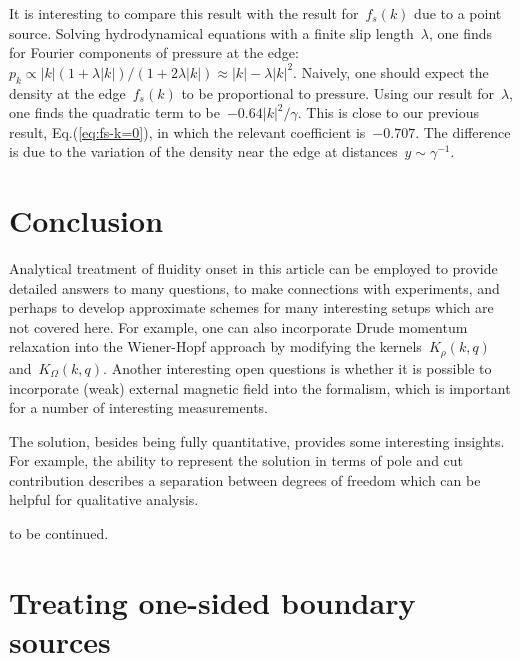 \documentclass[preprint,aps,eqsecnum, prb]{revtex4-1}
\begin{document}
It is interesting to compare this result with the result for~$f_s(k)$
due to a point source. Solving hydrodynamical equations with a finite
slip length~$\lambda$, one finds for Fourier components of
pressure at the edge:
$p_k \propto |k| (1 + \lambda |k|)/(1 + 2 \lambda|k|)
\approx |k| - \lambda |k|^2$. Naively, one should expect the
density at the edge~$f_s(k)$ to be proportional to pressure.
Using our result for~$\lambda$, one
finds the quadratic term to be~$-0.64 |k|^2/\gamma$. This is close
to our previous result, Eq.(\ref{eq:fs-k=0}), in which the relevant
coefficient is~$-0.707$. The difference is due to the variation
of the density near the edge at distances~$y\sim\gamma^{-1}$.

\section{Conclusion}
\label{sec:conclusion}



Analytical treatment of fluidity onset in this article can be employed
to provide detailed answers to many questions, to make connections with
experiments, and perhaps to develop approximate schemes for many
interesting setups which are not covered here.
For example, one can also incorporate Drude momentum relaxation into
the Wiener-Hopf approach by modifying the kernels~$K_\rho(k, q)$
and~$K_\Omega(k, q)$. Another  interesting open questions is whether it is
possible to incorporate (weak) external magnetic field into the formalism,
which is important for a number of interesting measurements.

The solution, besides being fully quantitative, provides some interesting
insights. For example, the ability to represent the solution in terms of
pole and cut contribution describes a separation between degrees of freedom
which can be helpful for qualitative analysis.

to be continued.



\appendix

\section{Treating one-sided boundary sources}
\label{sec:sources}
\end{document}

